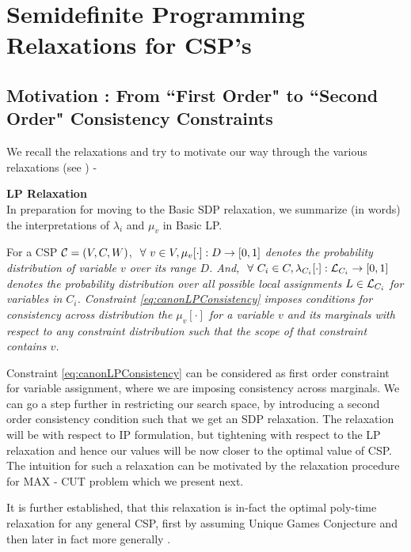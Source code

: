 \section{Semidefinite Programming Relaxations for CSP's}

\subsection{Motivation : From ``First Order" to ``Second Order" Consistency Constraints}

We recall the relaxations and try to motivate our way through the various relaxations (see \cite{Ryan}) -

\begin{discussion}{\bf LP Relaxation}\\
In preparation for moving to the Basic SDP relaxation, we summarize (in words) the interpretations of $\lambda_i$ and $\mu_v$ in Basic LP.

For a CSP $\mathcal{C} = (V, C, W)$,  \textit{$\ \forall \  v \in V, \mu_v[\cdot] : D \rightarrow [0, 1]$ denotes the \textit{probability distribution of variable $v$ over its range $D$}. And, $\ \forall \  C_i \in C, \lambda_{C_i}[\cdot] : \mathcal{L}_{C_i} \rightarrow [0,1]$ denotes the probability distribution over all possible local assignments $L \in \mathcal{L}_{C_i}$ for variables in  $C_i$.  
Constraint \ref{eq:canonLPConsistency} imposes conditions for consistency across distribution the $\mu_v[\cdot]$ for a variable $v$ and its marginals with respect to any constraint distribution such that the scope of that constraint contains $v$.}
\end{discussion}

Constraint \ref{eq:canonLPConsistency} can be considered as first order constraint for variable assignment, where we are imposing consistency across marginals. 
We can go a step further in restricting our search space, by introducing a second order consistency condition such that we get an SDP relaxation. 
The relaxation will be with respect to IP formulation, but tightening with respect to the LP relaxation and hence our values will be now closer to the optimal value of CSP. 
The intuition for such a relaxation can be motivated by the relaxation procedure for MAX - CUT problem which we present next. 

It is further established, that this relaxation is in-fact the optimal poly-time relaxation for any general CSP, first by assuming Unique Games Conjecture \cite{Khot} and then later in fact more generally \cite{nphard}. 


